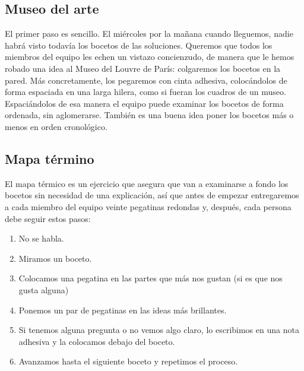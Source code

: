 \documentclass[10pt]{article}
\begin{document}
\begin{multicols}{2}
\subsection*{Museo del arte}
El primer paso es sencillo. El miércoles por la mañana cuando lleguemos, nadie habrá visto todavía los bocetos de las soluciones. Queremos que todos los miembros del equipo les echen un vistazo concienzudo, de manera que le hemos robado una idea al Museo del Louvre de París: colgaremos los bocetos en la pared. Más concretamente, los pegaremos con cinta adhesiva, colocándolos de forma espaciada en una larga hilera, como si fueran los cuadros de un museo. Espaciándolos de esa manera el equipo puede examinar los bocetos de forma ordenada, sin aglomerarse. También es una buena idea poner los bocetos más o menos en orden cronológico.
\subsection*{Mapa término}
El mapa térmico es un ejercicio que asegura que van a examinarse a fondo los bocetos sin necesidad de una explicación, así que antes de empezar entregaremos a cada miembro del equipo veinte pegatinas redondas y, después, cada persona debe seguir estos pasos:
\begin{enumerate}[\bfseries 1.]
\item No se habla.
\item Miramos un boceto.
\item Colocamos una pegatina en las partes que más nos gustan (si es que nos gusta alguna)
\item Ponemos un par de pegatinas en las ideas más brillantes.
\item Si tenemos alguna pregunta o no vemos algo claro, lo escribimos en una nota adhesiva y la colocamos debajo del boceto.
\item Avanzamos hasta el siguiente boceto y repetimos el proceso.
\end{enumerate}

\end{multicols}
\end{document}
